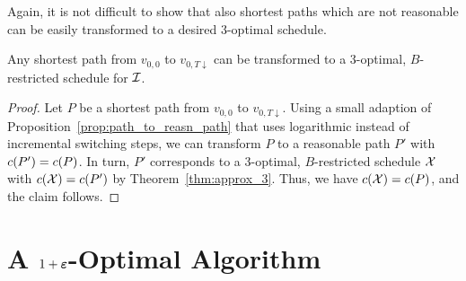 Again, it is not difficult to show that also shortest paths which are not reasonable can be easily transformed to a desired 3-optimal schedule.
\begin{cor}\label{cor:opt_sched_short_path_pseudo_lin}
Any shortest path from $v_{0,0}$ to $v_{0,T\downarrow}$ can be transformed to a 3-optimal, $B$-restricted schedule for $\mathcal{I}$.
\end{cor}
\begin{proof}
Let $P$ be a shortest path from $v_{0,0}$ to $v_{0,T\downarrow}$. Using a small adaption of Proposition~\ref{prop:path_to_reasn_path} that uses logarithmic instead of incremental switching steps, we can transform $P$ to a reasonable path $P'$ with $c(P')=c(P)$.
In turn, $P'$ corresponds to a 3-optimal, $B$-restricted schedule $\mathcal{X}$ with $c(\mathcal{X})=c(P')$ by Theorem~\ref{thm:approx_3}. Thus, we have $c(\mathcal{X})=c(P)$, and the claim follows.
\end{proof}


\section{A $1+\boldsymbol\varepsilon$-Optimal Algorithm}
